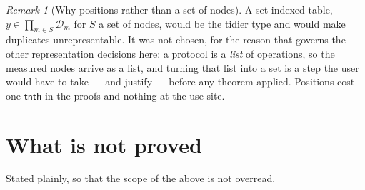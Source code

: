 \documentclass[11pt,a4paper]{article}
\theoremstyle{definition}
\theoremstyle{plain}
\theoremstyle{remark}
\newtheorem{remark}[definition]{Remark}
\newcommand{\dom}{\mathcal{D}}
\begin{document}
\begin{remark}[Why positions rather than a set of nodes]
\label{rem:positions}
A set-indexed table, $y \in \prod_{m \in S}\dom_m$ for $S$ a set of
nodes, would be the tidier type and would make duplicates
unrepresentable. It was not chosen, for the reason that governs the other
representation decisions here: a protocol is a \emph{list} of operations,
so the measured nodes arrive as a list, and turning that list into a set
is a step the user would have to take --- and justify --- before any
theorem applied. Positions cost one $\mathsf{tnth}$ in the proofs and
nothing at the use site.
\end{remark}

\section{What is not proved}
\label{sec:limits}

Stated plainly, so that the scope of the above is not overread.
\end{document}
